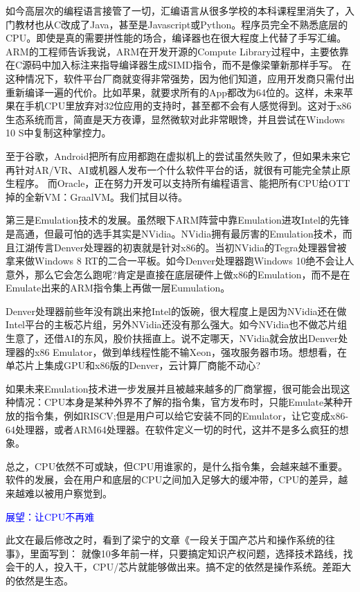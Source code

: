 \documentclass[utf8]{book}
\begin{document}
	如今高层次的编程语言接管了一切，汇编语言从很多学校的本科课程里消失了，入门教材也从C改成了Java，甚至是Javascript或Python。程序员完全不熟悉底层的CPU。即使是真的需要拼性能的场合，编译器也在很大程度上代替了手写汇编。ARM的工程师告诉我说，ARM在开发开源的Compute Library过程中，主要依靠在C源码中加入标注来指导编译器生成SIMD指令，而不是像梁肇新那样手写。
	在这种情况下，软件平台厂商就变得非常强势，因为他们知道，应用开发商只需付出重新编译一遍的代价。比如苹果，就要求所有的App都改为64位的。这样，未来苹果在手机CPU里放弃对32位应用的支持时，甚至都不会有人感觉得到。这对于x86生态系统而言，简直是天方夜谭，显然微软对此非常眼馋，并且尝试在Windows 10 S中复制这种掌控力。
	
	至于谷歌，Android把所有应用都跑在虚拟机上的尝试虽然失败了，但如果未来它再针对AR/VR、AI或机器人发布一个什么软件平台的话，就很有可能完全禁止原生程序。
	而Oracle，正在努力开发可以支持所有编程语言、能把所有CPU给OTT掉的全新VM：GraalVM。我们拭目以待。
	
	第三是Emulation技术的发展。虽然眼下ARM阵营中靠Emulation进攻Intel的先锋是高通，但最可怕的选手其实是NVidia。NVidia拥有最厉害的Emulation技术，而且江湖传言Denver处理器的初衷就是针对x86的。当初NVidia的Tegra处理器曾被拿来做Windows 8 RT的二合一平板。如今Denver处理器跑Windows 10绝不会让人意外，那么它会怎么跑呢?肯定是直接在底层硬件上做x86的Emulation，而不是在Emulate出来的ARM指令集上再做一层Eumulation。
	
	Denver处理器前些年没有跳出来抢Intel的饭碗，很大程度上是因为NVidia还在做Intel平台的主板芯片组，另外NVidia还没有那么强大。如今NVidia也不做芯片组生意了，还借AI的东风，股价扶摇直上。说不定哪天，NVidia就会放出Denver处理器的x86 Emulator，做到单线程性能不输Xeon，强攻服务器市场。想想看，在单芯片上集成GPU和x86版的Denver，云计算厂商能不动心?
	
	如果未来Emulation技术进一步发展并且被越来越多的厂商掌握，很可能会出现这种情况：CPU本身是某种外界不了解的指令集，官方发布时，只能Emulate某种开放的指令集，例如RISCV;但是用户可以给它安装不同的Emulator，让它变成x86-64处理器，或者ARM64处理器。在软件定义一切的时代，这并不是多么疯狂的想象。
	
	总之，CPU依然不可或缺，但CPU用谁家的，是什么指令集，会越来越不重要。软件的发展，会在用户和底层的CPU之间加入足够大的缓冲带，CPU的差异，越来越难以被用户察觉到。
	
	\begin{flushleft}
		{\large \textcolor{blue}{展望：让CPU不再难}}
	\end{flushleft}

	
	此文在最后修改之时，看到了梁宁的文章《一段关于国产芯片和操作系统的往事》，里面写到：
	就像10多年前一样，只要搞定知识产权问题，选择技术路线，找会干的人，投入干，CPU/芯片就能够做出来。搞不定的依然是操作系统。差距大的依然是生态。
	
\end{document}
